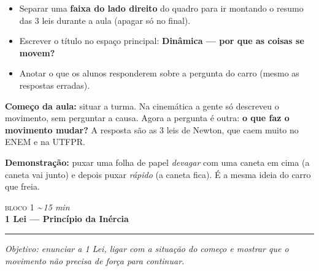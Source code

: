 \documentclass[11pt,a4paper]{article}
\newcommand{\bloco}[3]{%
  \needspace{7\baselineskip}
  \vspace{1.8em}
  {\scshape\color{vinho}bloco #1}\hfill
    {\small\itshape\color{grafite}\textasciitilde\,#3 min}\\[0.1em]
  {\Large\bfseries #2}\\[-0.55em]
  {\color{black!30}\rule{\linewidth}{0.5pt}}
  \par\nobreak\smallskip
}
\newcommand{\objetivo}[1]{{\itshape\color{grafite}Objetivo: #1}\par\smallskip}
\begin{document}
\begin{quadro}
\begin{itemize}[nosep]
  \item Separar uma \textbf{faixa do lado direito} do quadro para ir
        montando o resumo das 3 leis durante a aula (apagar s\'o no
        final).
  \item Escrever o t\'itulo no espa\c{c}o principal:
        \textbf{Din\^amica --- por que as coisas se movem?}
  \item Anotar o que os alunos responderem sobre a pergunta do carro
        (mesmo as respostas erradas).
\end{itemize}
\end{quadro}

\begin{obs}
\textbf{Come\c{c}o da aula:} situar a turma. Na cinem\'atica a gente
s\'o descreveu o movimento, sem perguntar a causa. Agora a pergunta \'e
outra: \textbf{o que faz o movimento mudar?} A resposta s\~ao as 3 leis
de Newton, que caem muito no ENEM e na UTFPR.

\textbf{Demonstra\c{c}\~ao:} puxar uma folha de papel \textit{devagar}
com uma caneta em cima (a caneta vai junto) e depois puxar
\textit{r\'apido} (a caneta fica). \'E a mesma ideia do carro que
freia.
\end{obs}

\bloco{1}{1\textordfeminine{} Lei --- Princ\'ipio da In\'ercia}{15}

\objetivo{enunciar a 1\textordfeminine{} Lei, ligar com a
situa\c{c}\~ao do come\c{c}o e mostrar que o movimento n\~ao precisa de
for\c{c}a para continuar.}
\end{document}
